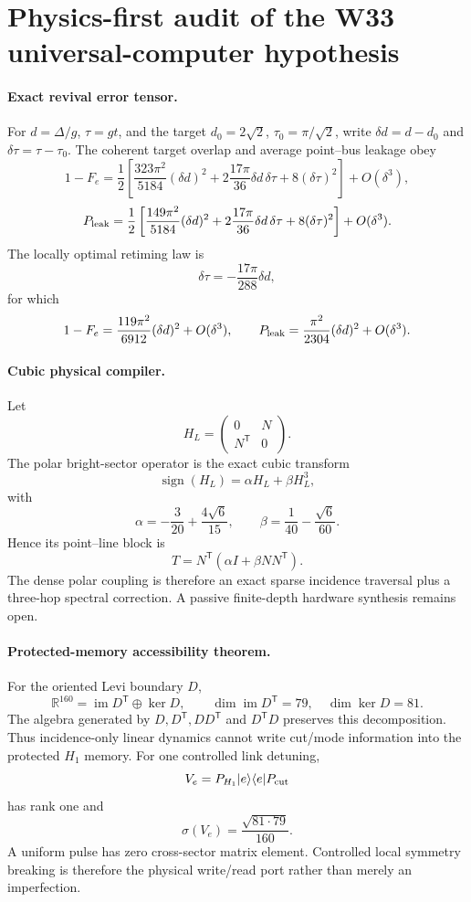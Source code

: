 \section{Physics-first audit of the W33 universal-computer hypothesis}
\label{sec:bt4025-4032}

\paragraph{Exact revival error tensor.}
For $d=\Delta/g$, $\tau=gt$, and the target
$d_0=2\sqrt2$, $\tau_0=\pi/\sqrt2$, write
$\delta d=d-d_0$ and $\delta\tau=\tau-\tau_0$.  The coherent target
overlap and average point--bus leakage obey
\[
1-F_e=\frac12\left[
\frac{323\pi^2}{5184}(\delta d)^2+
2\frac{17\pi}{36}\delta d\,\delta\tau+
8(\delta\tau)^2\right]+O(\delta^3),
\]
\[
P_{\rm leak}=\frac12\left[
\frac{149\pi^2}{5184}(\delta d)^2+
2\frac{17\pi}{36}\delta d\,\delta\tau+
8(\delta\tau)^2\right]+O(\delta^3).
\]
The locally optimal retiming law is
\[
\boxed{\delta\tau=-\frac{17\pi}{288}\delta d},
\]
for which
\[
1-F_e=\frac{119\pi^2}{6912}(\delta d)^2+O(\delta^3),
\qquad
P_{\rm leak}=\frac{\pi^2}{2304}(\delta d)^2+O(\delta^3).
\]

\paragraph{Cubic physical compiler.}
Let
\[
H_L=\begin{pmatrix}0&N\\N^{\mathsf T}&0\end{pmatrix}.
\]
The polar bright-sector operator is the exact cubic transform
\[
\boxed{\operatorname{sign}(H_L)=\alpha H_L+\beta H_L^3},
\]
with
\[
\alpha=-\frac3{20}+\frac{4\sqrt6}{15},
\qquad
\beta=\frac1{40}-\frac{\sqrt6}{60}.
\]
Hence its point--line block is
\[
\boxed{T=N^{\mathsf T}(\alpha I+\beta NN^{\mathsf T})}.
\]
The dense polar coupling is therefore an exact sparse incidence traversal plus
a three-hop spectral correction.  A passive finite-depth hardware synthesis
remains open.

\paragraph{Protected-memory accessibility theorem.}
For the oriented Levi boundary $D$,
\[
\mathbb R^{160}=\operatorname{im}D^{\mathsf T}\oplus\ker D,
\qquad
\dim\operatorname{im}D^{\mathsf T}=79,
\quad
\dim\ker D=81.
\]
The algebra generated by $D,D^{\mathsf T},DD^{\mathsf T}$ and
$D^{\mathsf T}D$ preserves this decomposition.  Thus incidence-only linear
dynamics cannot write cut/mode information into the protected $H_1$ memory.
For one controlled link detuning,
\[
V_e=P_{H_1}|e\rangle\langle e|P_{\rm cut}
\]
has rank one and
\[
\boxed{\sigma(V_e)=\frac{\sqrt{81\cdot79}}{160}}.
\]
A uniform pulse has zero cross-sector matrix element.  Controlled local
symmetry breaking is therefore the physical write/read port rather than merely
an imperfection.

